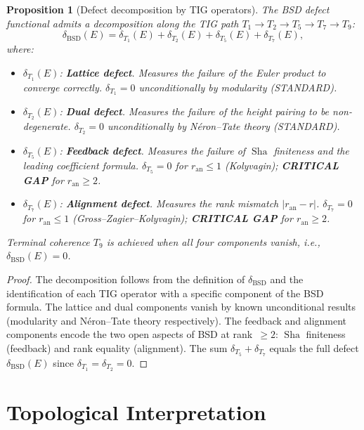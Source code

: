 \documentclass[11pt]{article}
\newtheorem{proposition}[theorem]{Proposition}
\DeclareMathOperator{\Sha}{Sha}
\begin{document}
\begin{proposition}[Defect decomposition by TIG operators]
\label{prop:delta-tig-decomp}
The BSD defect functional admits a decomposition along the TIG path
$T_1 \to T_2 \to T_5 \to T_7 \to T_9$:
\[
  \delta_{\mathrm{BSD}}(E) = \delta_{T_1}(E) + \delta_{T_2}(E) +
  \delta_{T_5}(E) + \delta_{T_7}(E),
\]
where:
\begin{itemize}
  \item $\delta_{T_1}(E)$: \textbf{Lattice defect}.  Measures the failure of
    the Euler product to converge correctly.  $\delta_{T_1} = 0$ unconditionally
    by modularity (STANDARD).
  \item $\delta_{T_2}(E)$: \textbf{Dual defect}.  Measures the failure of
    the height pairing to be non-degenerate.  $\delta_{T_2} = 0$ unconditionally
    by N\'eron--Tate theory (STANDARD).
  \item $\delta_{T_5}(E)$: \textbf{Feedback defect}.  Measures the failure of
    $\Sha$ finiteness and the leading coefficient formula.  $\delta_{T_5} = 0$
    for $r_{\mathrm{an}} \leq 1$ (Kolyvagin); \textbf{CRITICAL GAP} for
    $r_{\mathrm{an}} \geq 2$.
  \item $\delta_{T_7}(E)$: \textbf{Alignment defect}.  Measures the rank
    mismatch $|r_{\mathrm{an}} - r|$.  $\delta_{T_7} = 0$ for
    $r_{\mathrm{an}} \leq 1$ (Gross--Zagier--Kolyvagin); \textbf{CRITICAL GAP}
    for $r_{\mathrm{an}} \geq 2$.
\end{itemize}
Terminal coherence $T_9$ is achieved when all four components vanish, i.e.,
$\delta_{\mathrm{BSD}}(E) = 0$.
\end{proposition}

\begin{proof}
The decomposition follows from the definition of $\delta_{\mathrm{BSD}}$ and
the identification of each TIG operator with a specific component of the BSD
formula.  The lattice and dual components vanish by known unconditional results
(modularity and N\'eron--Tate theory respectively).  The feedback and alignment
components encode the two open aspects of BSD at rank~$\geq 2$: $\Sha$
finiteness (feedback) and rank equality (alignment).  The sum
$\delta_{T_5} + \delta_{T_7}$ equals the full defect
$\delta_{\mathrm{BSD}}(E)$ since $\delta_{T_1} = \delta_{T_2} = 0$.
\end{proof}

\section{Topological Interpretation}
\label{sec:topology}
\end{document}
